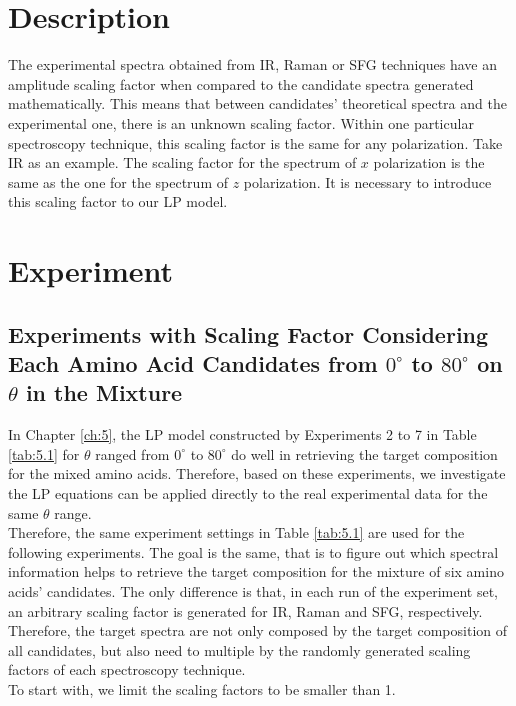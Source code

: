  \label{ch:6}
\section{Description}
The experimental spectra obtained from IR, Raman or SFG techniques have an amplitude scaling factor when compared to the candidate spectra generated mathematically. This means that between candidates' theoretical spectra and the experimental one, there is an unknown scaling factor. Within one particular spectroscopy technique, this scaling factor is the same for any polarization. Take IR as an example. The scaling factor for the spectrum of $x$ polarization is the same as the one for the spectrum of $z$ polarization. It is necessary to introduce this scaling factor to our LP model. \\

\section{Experiment}
\subsection{Experiments with Scaling Factor Considering Each Amino Acid Candidates from $0^{\circ}$ to $80^{\circ}$ on $\theta$ in the Mixture}
In Chapter \ref{ch:5}, the LP model constructed by Experiments 2 to 7 in Table \ref{tab:5.1} for $\theta$ ranged from $0^{\circ}$ to $80^{\circ}$ do well in retrieving the target composition for the mixed amino acids. Therefore, based on these experiments, we investigate the LP equations can be applied directly to the real experimental data for the same $\theta$ range.\\

Therefore, the same experiment settings in Table \ref{tab:5.1} are used for the following experiments. The goal is the same, that is to figure out which spectral information helps to retrieve the target composition for the mixture of six amino acids' candidates. The only difference is that, in each run of the experiment set, an arbitrary scaling factor is generated for IR, Raman and SFG, respectively. Therefore, the target spectra are not only composed by the target composition of all candidates, but also need to multiple by the randomly generated scaling factors of each spectroscopy technique. \\

To start with, we limit the scaling factors to be smaller than 1. \\


